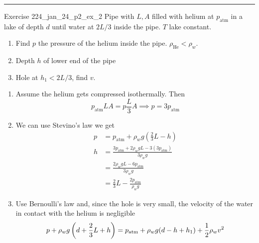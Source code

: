 \documentclass[10pt]{extarticle}
\begin{document}
\noindent\rule{\textwidth}{1pt}

\begin{question}{Exercise 2}{24_jan_24_p2_ex_2}
    Pipe with $L, A$ filled with helium at $p_\text{atm}$ in a lake of depth $d$ until water at $2L/3$ inside the pipe.
    $T$ lake constant.

    \begin{enumerate}
        \item Find $p$ the pressure of the helium inside the pipe. $\rho_{\text{He}} < \rho_w$.
        \item Depth $h$ of lower end of the pipe
        \item Hole at $h_1 < 2L/3$, find $v$.
    \end{enumerate}
\end{question}

\begin{solution}
    \begin{enumerate}
        \item Assume the helium gets compressed isothermally. Then
              \begin{equation}
                  p_\text{atm} L A = p \frac{L}{3} A \implies p = 3 p_\text{atm}
              \end{equation}

        \item We can use Stevino's law we get
              \begin{align}
                  p & = p_\text{atm} + \rho_w g \left(\frac{2}{3}L - h\right)            \\
                  h & = \frac{3p_\text{atm} + 2\rho_w g L - 3(3p_\text{atm})}{3\rho_w g} \\
                    & = \frac{2\rho_w g L - 6p_\text{atm}}{3\rho_w g}                    \\
                    & = \frac{2}{3}L - \frac{2 p_\text{atm}}{\rho_w g}
              \end{align}

        \item Use Bernoulli's law and, since the hole is very small, the velocity of the water in contact with the helium is negligible
              \begin{equation}
                  p + \rho_w g \left(d + \frac{2}{3}L + h\right) = p_\text{atm} + \rho_w g ( d - h + h_1) + \frac{1}{2} \rho_w v^2
              \end{equation}
    \end{enumerate}
\end{solution}
\end{document}
